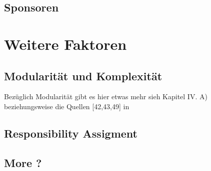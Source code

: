 
%



\subsection{Sponsoren}


\section{Weitere Faktoren} \label{sec:Weitere Faktoren}




\subsection{Modularität und Komplexität}

Bezüglich Modularität gibt es hier etwas mehr \cite{marganSuccessOpenSource2015} sieh Kapitel IV. A)
beziehungsweise die Quellen [42,43,49] in \cite{marganSuccessOpenSource2015}

\subsection{Responsibility Assigment}
\subsection{More ?}

